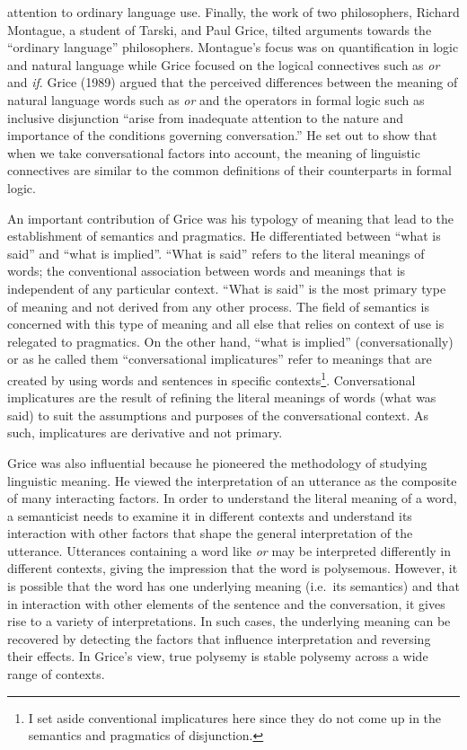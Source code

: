 \documentclass[oneside]{report}
\theoremstyle{definition}
\theoremstyle{definition}
\theoremstyle{definition}
\theoremstyle{remark}
\begin{document}
attention to ordinary language use. Finally, the work of two
philosophers, Richard Montague, a student of Tarski, and Paul Grice,
tilted arguments towards the ``ordinary language'' philosophers.
Montague's focus was on quantification in logic and natural language
while Grice focused on the logical connectives such as \emph{or} and
\emph{if}. Grice (1989) argued that the perceived differences between
the meaning of natural language words such as \emph{or} and the
operators in formal logic such as inclusive disjunction ``arise from
inadequate attention to the nature and importance of the conditions
governing conversation.'' He set out to show that when we take
conversational factors into account, the meaning of linguistic
connectives are similar to the common definitions of their counterparts
in formal logic.

An important contribution of Grice was his typology of meaning that lead
to the establishment of semantics and pragmatics. He differentiated
between ``what is said'' and ``what is implied''. ``What is said''
refers to the literal meanings of words; the conventional association
between words and meanings that is independent of any particular
context. ``What is said'' is the most primary type of meaning and not
derived from any other process. The field of semantics is concerned with
this type of meaning and all else that relies on context of use is
relegated to pragmatics. On the other hand, ``what is implied''
(conversationally) or as he called them ``conversational implicatures''
refer to meanings that are created by using words and sentences in
specific contexts\footnote{I set aside conventional implicatures here
  since they do not come up in the semantics and pragmatics of
  disjunction.}. Conversational implicatures are the result of refining
the literal meanings of words (what was said) to suit the assumptions
and purposes of the conversational context. As such, implicatures are
derivative and not primary.

Grice was also influential because he pioneered the methodology of
studying linguistic meaning. He viewed the interpretation of an
utterance as the composite of many interacting factors. In order to
understand the literal meaning of a word, a semanticist needs to examine
it in different contexts and understand its interaction with other
factors that shape the general interpretation of the utterance.
Utterances containing a word like \emph{or} may be interpreted
differently in different contexts, giving the impression that the word
is polysemous. However, it is possible that the word has one underlying
meaning (i.e.~its semantics) and that in interaction with other elements
of the sentence and the conversation, it gives rise to a variety of
interpretations. In such cases, the underlying meaning can be recovered
by detecting the factors that influence interpretation and reversing
their effects. In Grice's view, true polysemy is stable polysemy across
a wide range of contexts.
\end{document}
